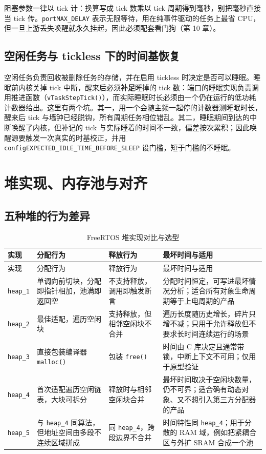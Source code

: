 \documentclass[12pt,a4paper,fontset=fandol]{ctexbook}
\newcommand{\Fn}[1]{\texttt{#1()}}
\newcommand{\Tp}[1]{\texttt{#1}}
\begin{document}
阻塞参数一律以 tick 计：换算写成 tick 数乘以 tick 周期得到毫秒，别把毫秒直接当 tick 传。\Tp{portMAX\_DELAY} 表示无限等待，用在纯事件驱动的任务上最省 CPU，但一旦上游丢失唤醒就永久挂起，因此必须配套看门狗（第 10 章）。

\subsection{空闲任务与 tickless 下的时间基恢复}

空闲任务负责回收被删除任务的存储，并在启用 tickless 时决定是否可以睡眠。睡眠前内核关掉 tick 中断，醒来后必须\textbf{补足}睡掉的 tick 数：端口的睡眠实现负责调用推进函数（\Fn{vTaskStepTick}），而实际睡眠时长必须由一个仍在运行的低功耗计数器给出。这里有两个坑。其一，用一个会随主频一起停的计数器测睡眠时长，醒来后 tick 与墙钟已经脱钩，所有周期任务相位错乱。其二，睡眠期间到达的中断唤醒了内核，但补记的 tick 与实际睡着的时间不一致，偏差按次累积；因此唤醒源要触发一次真实的时基校正，并用 \Tp{configEXPECTED\_IDLE\_TIME\_BEFORE\_SLEEP} 设门槛，短于门槛的不睡眠。

\section{堆实现、内存池与对齐}

\subsection{五种堆的行为差异}

\begin{longtable}{>{\raggedright\arraybackslash}p{} >{\raggedright\arraybackslash}p{} >{\raggedright\arraybackslash}p{} >{\raggedright\arraybackslash}p{}}
\caption{FreeRTOS 堆实现对比与选型}\label{tab:ch06-heap-variants}\\
\toprule
实现 & 分配行为 & 释放行为 & 最坏时间与适用 \\
\midrule
\endfirsthead
\toprule
实现 & 分配行为 & 释放行为 & 最坏时间与适用 \\
\midrule
\endhead
\bottomrule
\endfoot
\endlastfoot
\Tp{heap\_1} & 单调向前切块，分配即指针相加，池满即返回空 & 不支持释放，调用即触发断言 & 分配时间恒定，可写进最坏情况分析；适合所有对象生命周期等于上电周期的产品 \\
\Tp{heap\_2} & 最佳适配，遍历空闲块 & 支持释放，但相邻空闲块不合并 & 遍历长度随历史增长，碎片只增不减；只用于允许释放但不要求长时间连续运行的场景 \\
\Tp{heap\_3} & 直接包装编译器 \Fn{malloc} & 包装 \Fn{free} & 时间由 C 库决定且通常带锁，中断上下文不可用；仅用于原型验证 \\
\Tp{heap\_4} & 首次适配遍历空闲链表，大块可拆分 & 释放时与相邻空闲块合并 & 最坏时间取决于空闲块数量，仍不可界；适合确有动态对象、又不想引入第三方分配器的产品 \\
\Tp{heap\_5} & 与 \Tp{heap\_4} 同算法，但地址空间由多段不连续区域拼成 & 同 \Tp{heap\_4}，跨段边界不合并 & 时间特性同 \Tp{heap\_4}；用于分散的 RAM 域，例如把紧耦合区与外扩 SRAM 合成一个池 \\
\end{longtable}
\end{document}
